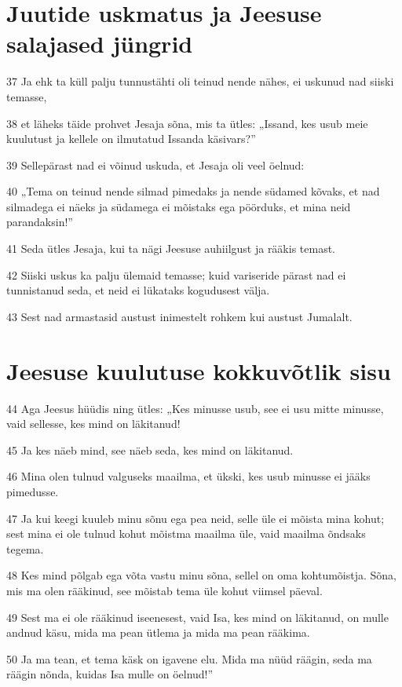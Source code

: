 \section*{Juutide uskmatus ja Jeesuse salajased jüngrid}

\par 37 Ja ehk ta küll palju tunnustähti oli teinud nende nähes, ei uskunud nad siiski temasse,
\par 38 et läheks täide prohvet Jesaja sõna, mis ta ütles: „Issand, kes usub meie kuulutust ja kellele on ilmutatud Issanda käsivars?”
\par 39 Sellepärast nad ei võinud uskuda, et Jesaja oli veel öelnud:
\par 40 „Tema on teinud nende silmad pimedaks ja nende südamed kõvaks, et nad silmadega ei näeks ja südamega ei mõistaks ega pöörduks, et mina neid parandaksin!”
\par 41 Seda ütles Jesaja, kui ta nägi Jeesuse auhiilgust ja rääkis temast.
\par 42 Siiski uskus ka palju ülemaid temasse; kuid variseride pärast nad ei tunnistanud seda, et neid ei lükataks kogudusest välja.
\par 43 Sest nad armastasid austust inimestelt rohkem kui austust Jumalalt.

\section*{Jeesuse kuulutuse kokkuvõtlik sisu}

\par 44 Aga Jeesus hüüdis ning ütles: „Kes minusse usub, see ei usu mitte minusse, vaid sellesse, kes mind on läkitanud!
\par 45 Ja kes näeb mind, see näeb seda, kes mind on läkitanud.
\par 46 Mina olen tulnud valguseks maailma, et ükski, kes usub minusse ei jääks pimedusse.
\par 47 Ja kui keegi kuuleb minu sõnu ega pea neid, selle üle ei mõista mina kohut; sest mina ei ole tulnud kohut mõistma maailma üle, vaid maailma õndsaks tegema.
\par 48 Kes mind põlgab ega võta vastu minu sõna, sellel on oma kohtumõistja. Sõna, mis ma olen rääkinud, see mõistab tema üle kohut viimsel päeval.
\par 49 Sest ma ei ole rääkinud iseenesest, vaid Isa, kes mind on läkitanud, on mulle andnud käsu, mida ma pean ütlema ja mida ma pean rääkima.
\par 50 Ja ma tean, et tema käsk on igavene elu. Mida ma nüüd räägin, seda ma räägin nõnda, kuidas Isa mulle on öelnud!”


